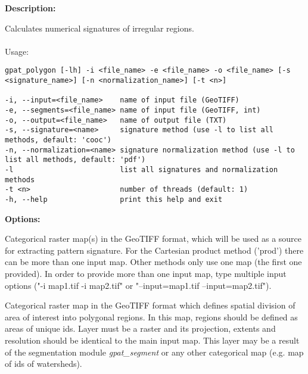






{\bf Description:}

Calculates numerical signatures of irregular regions.
\\\\
Usage:

\begin{minipage}{\linewidth}
\begin{lstlisting}
gpat_polygon [-lh] -i <file_name> -e <file_name> -o <file_name> [-s <signature_name>] [-n <normalization_name>] [-t <n>]

-i, --input=<file_name>    name of input file (GeoTIFF)
-e, --segments=<file_name> name of input file (GeoTIFF, int)
-o, --output=<file_name>   name of output file (TXT)
-s, --signature=<name>     signature method (use -l to list all methods, default: 'cooc')
-n, --normalization=<name> signature normalization method (use -l to list all methods, default: 'pdf')
-l                         list all signatures and normalization methods
-t <n>                     number of threads (default: 1)
-h, --help                 print this help and exit
\end{lstlisting}
\end{minipage}

{\bf Options:}


Categorical raster map(s) in the GeoTIFF format, which will be used as a source for extracting pattern signature. 
For the Cartesian product method ('prod') there can be more than one input map. 
Other methods only use one map (the first one provided). 
In order to provide more than one input map, type multiple input options ("-i map1.tif -i map2.tif" or "--input=map1.tif --input=map2.tif").


Categorical raster map in the GeoTIFF format which defines spatial division of area of interest into polygonal regions.
In this map, regions should be defined as areas of unique ids. 
Layer must be a raster and its projection, extents and resolution should be identical to the main input map. 
This layer may be a result of the segmentation module {\it gpat\_segment} or any other categorical map (e.g. map of ids of watersheds).

